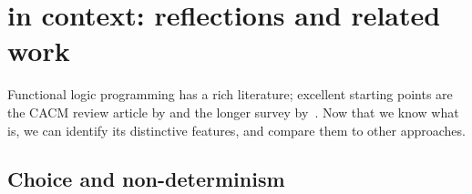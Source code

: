 \documentclass[acmsmall]{acmart}
\begin{document}
%
%
%

\section{\texorpdfstring{\versecalc{}}{The Verse calculus} in context: reflections and related work} \label{sec:related}

Functional logic programming has a rich literature; excellent
starting points are the CACM review article by \citet{antoy-hanus:survey} and
the longer survey by~\citet{hanus:survey}.  Now that we
know what \versecalc{} is, we can identify its distinctive features,
and compare them to other approaches.

\subsection{Choice and non-determinism} \label{sec:deterministic}
\end{document}
